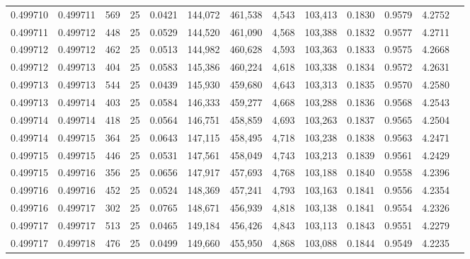 \begin{tabular}{rrrrrrrrrrrrr}
0.499710 & 0.499711 &   569 &  25 &                                     0.0421 & 144,072 & 461,538 &   4,543 & 103,413 & 0.1830 & 0.9579 & 4.2752 \\
0.499711 & 0.499712 &   448 &  25 &                                     0.0529 & 144,520 & 461,090 &   4,568 & 103,388 & 0.1832 & 0.9577 & 4.2711 \\
0.499712 & 0.499712 &   462 &  25 &                                     0.0513 & 144,982 & 460,628 &   4,593 & 103,363 & 0.1833 & 0.9575 & 4.2668 \\
0.499712 & 0.499713 &   404 &  25 &                                     0.0583 & 145,386 & 460,224 &   4,618 & 103,338 & 0.1834 & 0.9572 & 4.2631 \\
0.499713 & 0.499713 &   544 &  25 &                                     0.0439 & 145,930 & 459,680 &   4,643 & 103,313 & 0.1835 & 0.9570 & 4.2580 \\
0.499713 & 0.499714 &   403 &  25 &                                     0.0584 & 146,333 & 459,277 &   4,668 & 103,288 & 0.1836 & 0.9568 & 4.2543 \\
0.499714 & 0.499714 &   418 &  25 &                                     0.0564 & 146,751 & 458,859 &   4,693 & 103,263 & 0.1837 & 0.9565 & 4.2504 \\
0.499714 & 0.499715 &   364 &  25 &                                     0.0643 & 147,115 & 458,495 &   4,718 & 103,238 & 0.1838 & 0.9563 & 4.2471 \\
0.499715 & 0.499715 &   446 &  25 &                                     0.0531 & 147,561 & 458,049 &   4,743 & 103,213 & 0.1839 & 0.9561 & 4.2429 \\
0.499715 & 0.499716 &   356 &  25 &                                     0.0656 & 147,917 & 457,693 &   4,768 & 103,188 & 0.1840 & 0.9558 & 4.2396 \\
0.499716 & 0.499716 &   452 &  25 &                                     0.0524 & 148,369 & 457,241 &   4,793 & 103,163 & 0.1841 & 0.9556 & 4.2354 \\
0.499716 & 0.499717 &   302 &  25 &                                     0.0765 & 148,671 & 456,939 &   4,818 & 103,138 & 0.1841 & 0.9554 & 4.2326 \\
0.499717 & 0.499717 &   513 &  25 &                                     0.0465 & 149,184 & 456,426 &   4,843 & 103,113 & 0.1843 & 0.9551 & 4.2279 \\
0.499717 & 0.499718 &   476 &  25 &                                     0.0499 & 149,660 & 455,950 &   4,868 & 103,088 & 0.1844 & 0.9549 & 4.2235 \\

\end{tabular}
